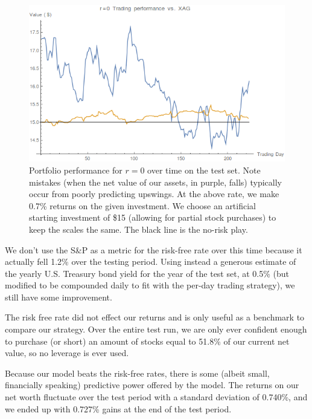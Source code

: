\documentclass{article}
\begin{document}
\begin{figure}[ht]
\vskip 0.2in
\begin{center}
\centerline{\includegraphics[scale=0.3]{images/sparse-silver.png}}
\caption{Portfolio performance for $r=0$ over time on the test set. Note mistakes (when the net value of our assets, in purple, falls) typically occur from poorly predicting upswings. At the above rate, we make 0.7\% returns on the given investment. We choose an artificial starting investment of \$15 (allowing for partial stock purchases) to keep the scales the same. The black line is the no-risk play.}
\end{center}
\vskip -0.2in
\label{fig:preprocess}
\end{figure}

We don't use the S\&P as a metric for the risk-free rate over this time because it actually fell 1.2\% over the testing period. Using instead a generous estimate of the yearly U.S. Treasury bond yield for the year of the test set, at 0.5\% (but modified to be compounded daily to fit with the per-day trading strategy), we still have some improvement.

The risk free rate did not effect our returns and is only useful as a benchmark to compare our strategy. Over the entire test run, we are only ever confident enough to purchase (or short) an amount of stocks equal to 51.8\% of our current net value, so no leverage is ever used.

Because our model beats the risk-free rates, there is some (albeit small, financially speaking) predictive power offered by the model. The returns on our net worth fluctuate over the test period with a standard deviation of 0.740\%, and we ended up with 0.727\% gains at the end of the test period.
\end{document}
